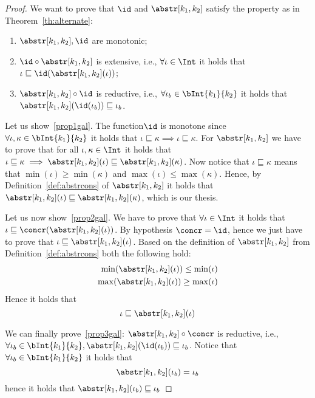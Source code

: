 \begin{proof}
  We want to prove that \(\id\) and \(\abstr[k_1,k_2]\) satisfy the
  property as in Theorem~\ref{th:alternate}:
  \begin{enumerate}[label=(\arabic*)]
  \item\label{prop1gal} \(\abstr[k_1,k_2], \id\) are monotonic;
  \item\label{prop2gal} \(\id \circ \abstr[k_1, k_2]\) is
    extensive, i.e., \(\forall \iota \in \Int\) it holds that
    \(\iota \sqsubseteq \id(\abstr[k_1, k_2](\iota))\);
    
  \item\label{prop3gal} \(\abstr[k_1,k_2] \circ \id\) is reductive,
    i.e., \(\forall \iota_b \in \bInt{k_1}{k_2}\) it holds that
    \(\abstr[k_1, k_2](\id(\iota_b)) \sqsubseteq \iota_b\).
  \end{enumerate}

  \medskip

  \noindent
  Let us show~\ref{prop1gal}. The function\(\id\) is monotone since
  \(\forall \iota, \kappa \in \bInt{k_1}{k_2}\) it holds that
  \(\iota \sqsubseteq \kappa \implies \iota \sqsubseteq \kappa\). For
  \(\abstr[k_1,k_2]\) we have to prove that for all
  \(\iota, \kappa \in \Int\) it holds that
  \(\iota \sqsubseteq \kappa \implies \abstr[k_1,k_2](\iota)
  \sqsubseteq \abstr[k_1,k_2](\kappa)\). Now notice that
  \(\iota \sqsubseteq \kappa \) means that
  \(\min(\iota) \geq \min(\kappa)\) and
  \(\max(\iota) \leq \max(\kappa)\). Hence, by
  Definition~\ref{def:abstrcons} of \(\abstr[k_1, k_2]\) it holds that
  \(\abstr[k_1, k_2](\iota) \sqsubseteq \abstr[k_1, k_2](\kappa)\),
  which is our thesis.

  \medskip

  \noindent
  Let us now show~\ref{prop2gal}. We have to prove that
  \(\forall \iota \in \Int\) it holds that
  \(\iota \sqsubseteq \concr(\abstr[k_1,k_2](\iota))\). By hypothesis
  \(\concr = \id\), hence we just have to prove that
  \(\iota \sqsubseteq \abstr[k_1, k_2](\iota)\). Based on the
  definition of \(\abstr[k_1, k_2]\) from
  Definition~\ref{def:abstrcons} both the following hold:
  \begin{align*}
    \min(\abstr[k_1,k_2](\iota)) \leq \min(\iota) \\
    \max(\abstr[k_1,k_2](\iota)) \geq \max(\iota)
  \end{align*}
  Hence it holds that
  \begin{equation}
    \iota \sqsubseteq \abstr[k_1, k_2](\iota)
  \end{equation}

  \medskip

  \noindent
  We can finally prove~\ref{prop3gal}:
  \(\abstr[k_1, k_2] \circ \concr\) is reductive, i.e.,
  \(\forall \iota_b \in \bInt{k_1}{k_2}, \abstr[k_1,k_2](\id(\iota_b))
  \sqsubseteq \iota_b\).  Notice that
  \(\forall \iota_b \in \bInt{k_1}{k_2}\) it holds that
  \begin{equation}\label{eq:injection}
    \abstr[k_1,k_2](\iota_b) = \iota_b
  \end{equation}
  hence it holds that \(\abstr[k_1,k_2](\iota_b) \sqsubseteq \iota_b\)
\end{proof}

